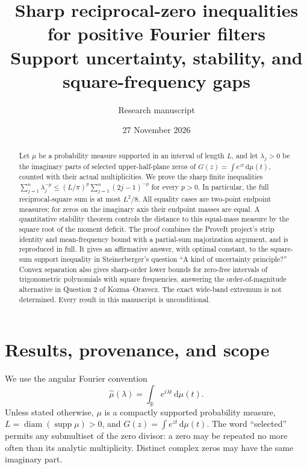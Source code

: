 \documentclass[11pt]{article}
\title{Sharp reciprocal-zero inequalities for positive Fourier filters\\
\large Support uncertainty, stability, and square-frequency gaps}
\author{Research manuscript}
\date{27 November 2026}
\theoremstyle{remark}\newtheorem{remark}[theorem]{Remark}
\newcommand{\R}{\mathbb R}
\newcommand{\dd}{\,\mathrm d}
\newcommand{\supp}{\operatorname{supp}}
\newcommand{\diam}{\operatorname{diam}}
\begin{document}
\maketitle
\begin{abstract}
Let $\mu$ be a probability measure supported in an interval of length $L$, and let
$\lambda_j>0$ be the imaginary parts of selected upper-half-plane zeros of
$G(z)=\int e^{zt}\dd\mu(t)$, counted with their actual multiplicities.
We prove the sharp finite inequalities
$\sum_{j=1}^n\lambda_j^{-p}\le (L/\pi)^p\sum_{j=1}^n(2j-1)^{-p}$ for every $p>0$.
In particular, the full reciprocal-square sum is at most $L^2/8$.
All equality cases are two-point endpoint measures; for zeros on the imaginary
axis their endpoint masses are equal. A quantitative stability theorem controls
the distance to this equal-mass measure by the square root of the moment deficit.
The proof combines the ProveIt project's strip identity and mean-frequency bound
with a partial-sum majorization argument, and is reproduced in full.
It gives an affirmative answer, with optimal constant, to the square-sum support
inequality in Steinerberger's question ``A kind of uncertainty principle?''
Convex separation also gives sharp-order lower bounds for zero-free intervals of
trigonometric polynomials with square frequencies, answering the order-of-magnitude
alternative in Question 2 of Kozma--Oravecz. The exact wide-band extremum is not
determined. Every result in this manuscript is unconditional.
\end{abstract}

\section{Results, provenance, and scope}

We use the angular Fourier convention
\[
 \widehat\mu(\lambda)=\int_\R e^{i\lambda t}\dd\mu(t).
\]
Unless stated otherwise, $\mu$ is a compactly supported probability measure,
$L=\diam(\supp\mu)>0$, and $G(z)=\int e^{zt}\dd\mu(t)$.
The word ``selected'' permits any submultiset of the zero divisor: a zero may be
repeated no more often than its analytic multiplicity. Distinct complex zeros
may have the same imaginary part.
\end{document}
